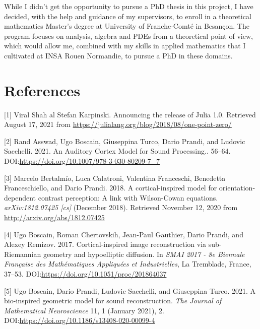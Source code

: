 \documentclass[american,]{article}
\theoremstyle{definition}
\theoremstyle{definition}
\theoremstyle{definition}
\theoremstyle{remark}
\begin{document}
While I didn't get the opportunity to pursue a PhD thesis in this project,
I have decided, with the help and guidance of my supervisors, to enroll in a
theoretical mathematics Master's degree at University of Franche-Comté in Besançon.
The program focuses on analysis, algebra and PDEs from a theoretical point of view,
which would allow me, combined with my skills in applied mathematics that
I cultivated at INSA Rouen Normandie, to pursue a PhD in these domains.

\pagebreak

\hypertarget{references}{%
\section*{References}\label{references}}

\hypertarget{refs}{}
\leavevmode\hypertarget{ref-julia2018}{}%
{[}1{]} Viral Shah al Stefan Karpinski. Announcing the release of Julia 1.0. Retrieved August 17, 2021 from \url{https://julialang.org/blog/2018/08/one-point-zero/}

\leavevmode\hypertarget{ref-asswad2021}{}%
{[}2{]} Rand Asswad, Ugo Boscain, Giuseppina Turco, Dario Prandi, and Ludovic Sacchelli. 2021. An Auditory Cortex Model for Sound Processing.. 56--64. DOI:\url{https://doi.org/10.1007/978-3-030-80209-7_7}

\leavevmode\hypertarget{ref-bertalmio2018}{}%
{[}3{]} Marcelo Bertalmío, Luca Calatroni, Valentina Franceschi, Benedetta Franceschiello, and Dario Prandi. 2018. A cortical-inspired model for orientation-dependent contrast perception: A link with Wilson-Cowan equations. \emph{arXiv:1812.07425 {[}cs{]}} (December 2018). Retrieved November 12, 2020 from \url{http://arxiv.org/abs/1812.07425}

\leavevmode\hypertarget{ref-boscain2017}{}%
{[}4{]} Ugo Boscain, Roman Chertovskih, Jean-Paul Gauthier, Dario Prandi, and Alexey Remizov. 2017. Cortical-inspired image reconstruction via sub-Riemannian geometry and hypoelliptic diffusion. In \emph{SMAI 2017 - 8e Biennale Française des Mathématiques Appliquées et Industrielles}, La Tremblade, France, 37--53. DOI:\url{https://doi.org/10.1051/proc/201864037}

\leavevmode\hypertarget{ref-boscain2021}{}%
{[}5{]} Ugo Boscain, Dario Prandi, Ludovic Sacchelli, and Giuseppina Turco. 2021. A bio-inspired geometric model for sound reconstruction. \emph{The Journal of Mathematical Neuroscience} 11, 1 (January 2021), 2. DOI:\url{https://doi.org/10.1186/s13408-020-00099-4}
\end{document}

